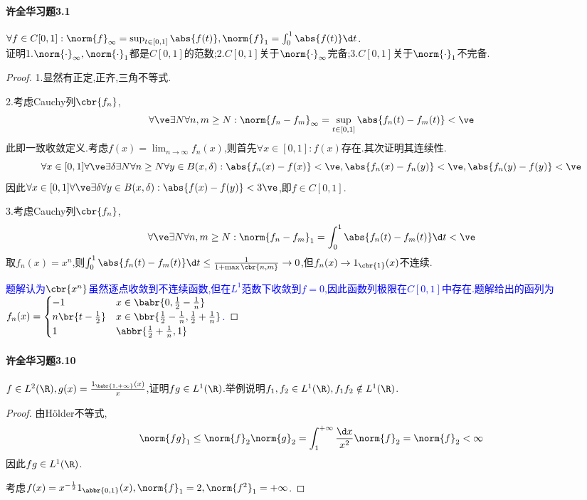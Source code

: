 \documentclass{article}
\begin{document}
\paragraph{许全华习题3.1}$\forall f\in C[0,1]:\norm{f}_\infty=\sup_{t\in [0,1]}\abs{f(t)}, \norm{f}_1=\int_0^1\abs{f(t)}\d t$.\\
证明1.$\norm{\cdot}_\infty,\norm{\cdot}_1$都是$C[0,1]$的范数;2.$C[0,1]$关于$\norm{\cdot}_\infty$完备;3.$C[0,1]$关于$\norm{\cdot}_1$不完备.
\begin{proof}
    1.显然有正定,正齐,三角不等式.

    2.考虑Cauchy列$\cbr{f_n}$,$$\forall \ve\exists N\forall n,m\geq N:\norm{f_n-f_m}_\infty=\sup_{t\in [0,1]}\abs{f_n(t)-f_m(t)}<\ve$$
    此即一致收敛定义.考虑$f(x)=\lim_{n\to\infty}f_n(x)$,则首先$\forall x\in [0,1]:f(x)$存在.其次证明其连续性.$$\forall x\in [0,1]\forall \ve\exists \delta\exists N\forall n\geq N\forall y\in B(x,\delta):\abs{f_n(x)-f(x)}<\ve, \abs{f_n(x)-f_n(y)}<\ve, \abs{f_n(y)-f(y)}<\ve$$
    因此$\forall x\in [0,1]\forall \ve\exists \delta\forall y\in B(x,\delta):\abs{f(x)-f(y)}<3\ve$,即$f\in C[0,1]$.

    3.考虑Cauchy列$\cbr{f_n}$,$$\forall \ve\exists N\forall n,m\geq N:\norm{f_n-f_m}_1=\int_0^1\abs{f_n(t)-f_m(t)}\d t<\ve$$
    取$f_n(x)=x^{n}$,则$\int_0^1\abs{f_n(t)-f_m(t)}\d t\leq \frac{1}{1+\max\cbr{n,m}}\to 0$,但$f_n(x)\to 1_{\cbr{1}}(x)$不连续.

    \textcolor{blue}{题解认为$\cbr{x^n}$虽然逐点收敛到不连续函数,但在$L^1$范数下收敛到$f=0$,因此函数列极限在$C[0,1]$中存在.题解给出的函列为$f_n(x)=\begin{cases}
        -1&x\in \babr{0,\frac{1}{2}-\frac{1}{n}}\\
        n\br{t-\frac{1}{2}}&x\in \bbr{\frac{1}{2}-\frac{1}{n},\frac{1}{2}+\frac{1}{n}}\\
        1&\abbr{\frac{1}{2}+\frac{1}{n},1}
    \end{cases}$.}
\end{proof}

\paragraph{许全华习题3.10}$f\in L^2(\R),g(x)=\frac{1_{\babr{1,+\infty}}(x)}{x}$,证明$fg\in L^1(\R)$.举例说明$f_1,f_2\in L^1(\R),f_1 f_2\notin L^1(\R)$.

\begin{proof}
    由H\"{o}lder不等式,$$\norm{fg}_1\leq \norm{f}_2\norm{g}_2=\int_1^{+\infty}\frac{\d x}{x^2}\norm{f}_2=\norm{f}_2<\infty$$
    因此$fg\in L^1(\R)$.

    考虑$f(x)=x^{-\frac{1}{2}}1_{\abbr{0,1}}(x),\norm{f}_1=2,\norm{f^2}_1=+\infty$.
\end{proof}
\end{document}
